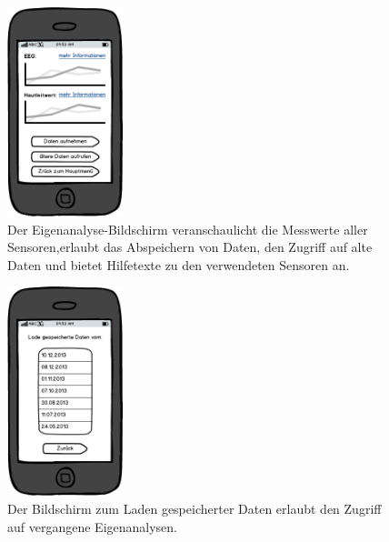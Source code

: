 \documentclass[10pt, a4paper, oneside, titlepage]{scrartcl} %
\begin{document}
	\newpage
	\begin{figure}[ht!]
		\begin{center}
			\includegraphics[width=0.3\textwidth]{mockup_09_selfanalysis.png}
		\end{center}
		\caption[Mockup Bildschirm Eigenanalyse]{Der Eigenanalyse-Bildschirm veranschaulicht die Messwerte aller Sensoren,erlaubt das Abspeichern von Daten, den Zugriff auf alte Daten und bietet Hilfetexte zu den verwendeten Sensoren an.}
		\label{fig:mockup_09}
	\end{figure}	
	\begin{figure}[h!]
		\begin{center}
			\includegraphics[width=0.3\textwidth]{mockup_10_saveddata.png}
		\end{center}
		\caption[Mockup Bildschirm zum Laden gespeicherter Daten]{Der Bildschirm zum Laden gespeicherter Daten erlaubt den Zugriff auf vergangene Eigenanalysen.}
		\label{fig:mockup_10}
	\end{figure}	
	
\end{document}
